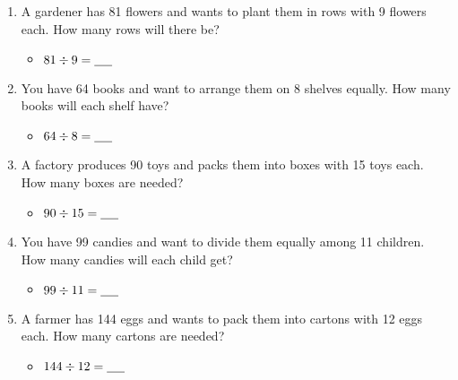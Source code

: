 \begin{enumerate}[label=(\alph*)]
\begin{itemize}
    \end{itemize}
    \item A gardener has 81 flowers and wants to plant them in rows with 9 flowers each. How many rows will there be?
    \begin{itemize}
        \item $81 \div 9 = \underline{\hspace{0.5cm}}$
    \end{itemize}
    \item You have 64 books and want to arrange them on 8 shelves equally. How many books will each shelf have?
    \begin{itemize}
        \item $64 \div 8 = \underline{\hspace{0.5cm}}$
    \end{itemize}
    \item A factory produces 90 toys and packs them into boxes with 15 toys each. How many boxes are needed?
    \begin{itemize}
        \item $90 \div 15 = \underline{\hspace{0.5cm}}$
    \end{itemize}
    \item You have 99 candies and want to divide them equally among 11 children. How many candies will each child get?
    \begin{itemize}
        \item $99 \div 11 = \underline{\hspace{0.5cm}}$
    \end{itemize}
    \item A farmer has 144 eggs and wants to pack them into cartons with 12 eggs each. How many cartons are needed?
    \begin{itemize}
        \item $144 \div 12 =  \underline{\hspace{0.5cm}}$
    \end{itemize}
\end{enumerate}
